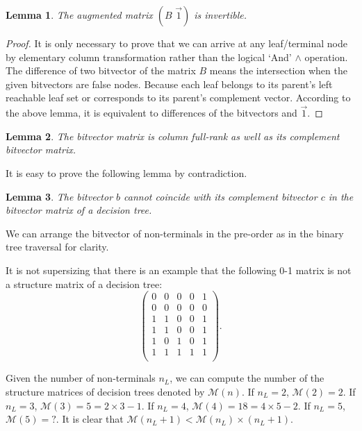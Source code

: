 \documentclass[UTF8]{article}
\newtheorem{lemma}{Lemma}
\newtheorem{proof}{Proof}[section]
\begin{document}
\begin{lemma}
The augmented matrix $(B\,\, \vec{1})$ is invertible.
\end{lemma}
\begin{proof}
It is only necessary to prove that
we can arrive at any leaf/terminal node by elementary column transformation
rather than the logical `And' $\wedge$ operation.
The difference of two bitvector of the matrix $B$ means the intersection
when the given bitvectors are false nodes.
Because each leaf belongs to its parent's left reachable leaf set or
corresponds to  its parent's complement vector.
According to the above lemma, it is equivalent to differences of the bitvectors and $\vec 1$.
\end{proof}

\begin{lemma}
The bitvector matrix is column full-rank as well as its complement bitvector matrix.
\end{lemma}
It is easy to prove the following lemma by contradiction.
\begin{lemma}
The bitvector $b$ cannot coincide with  its complement bitvector $c$ in the bitvector matrix of a decision tree.
\end{lemma}

We can arrange the bitvector of non-terminals in the pre-order as in the binary tree traversal for clarity.

It is not supersizing that
there is an example that the following 0-1 matrix  is not a structure matrix of a decision tree:
$$
\begin{pmatrix}
0 & 0 & 0 & 0 & 1\\
0 & 0 & 0 & 0 & 0\\
1 & 1 & 0 & 0 & 1\\
1 & 1 & 0 & 0 & 1\\
1 & 0 & 1 & 0 & 1\\
1 & 1 & 1 & 1 & 1\\
\end{pmatrix}.
$$

Given the number of non-terminals $n_L$, we can compute the number of the structure matrices of decision trees denoted by $\mathcal{M}(n)$.
If $n_L=2$, $\mathcal{M}(2)=2$.
If $n_L=3$, $\mathcal{M}(3)=5=2\times 3-1$.
If $n_L=4$, $\mathcal{M}(4)=18=4\times 5 - 2$.
If $n_L=5$, $\mathcal{M}(5)=?$.
It is clear that $\mathcal{M}(n_L+1)<\mathcal{M}(n_L)\times (n_L+1)$.
\end{document}
